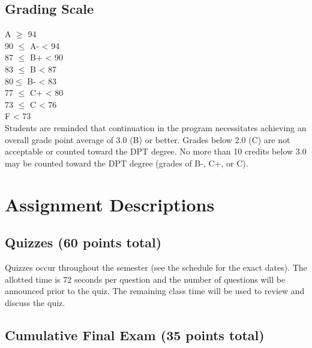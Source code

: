 \documentclass[letterpaper]{inzane_syllabus} %
\begin{document}
\subsection{Grading Scale}

A $\ge$ 94  \\
90 $\le$ A- < 94 \\
87 $\le$ B+ < 90 \\
83 $\le$ B < 87 \\
80$\le$ B- < 83 \\
77 $\le$ C+ < 80 \\
73 $\le$ C < 76 \\
F < 73 \\

Students are reminded that continuation in the program necessitates achieving an overall grade point average of 3.0 (B) or better.  Grades below 2.0 (C) are not acceptable or counted toward the DPT degree.  No more than 10 credits below 3.0 may be counted toward the DPT degree (grades of B-, C+, or C). 

\section{Assignment Descriptions}
\subsection{Quizzes (60 points total)}

\begin{twentyshort}
\end{twentyshort}

Quizzes occur throughout the semester (see the schedule for the exact dates).  The allotted time is 72 seconds per question and the number of questions will be announced prior to the quiz. The remaining class time will be used to review and discuss the quiz. 

\subsection{Cumulative Final Exam (35 points total)}
\end{document}
